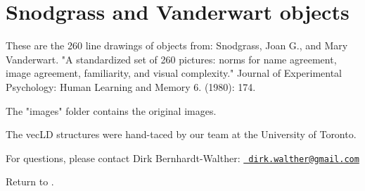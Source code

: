 \chapter{Snodgrass and Vanderwart objects}
\hypertarget{md_data_sets_2_snodgrass___vanderwart_2_snodgrass___vanderwart___readme}{}\label{md_data_sets_2_snodgrass___vanderwart_2_snodgrass___vanderwart___readme}
\label{md_data_sets_2_snodgrass___vanderwart_2_snodgrass___vanderwart___readme_autotoc_md3}%
%
 These are the 260 line drawings of objects from\+: Snodgrass, Joan G., and Mary Vanderwart. "{}\+A standardized set of 260 pictures\+:  norms for name agreement, image agreement, familiarity, and visual complexity."{} Journal of Experimental Psychology\+: Human Learning and Memory 6. (1980)\+: 174.

The "{}images"{} folder contains the original images.

The vec\+LD structures were hand-\/taced by our team at the University of Toronto.

For questions, please contact Dirk Bernhardt-\/\+Walther\+: \href{mailto:dirk.walther@gmail.com}{\texttt{ dirk.\+walther@gmail.\+com}}

Return to . 